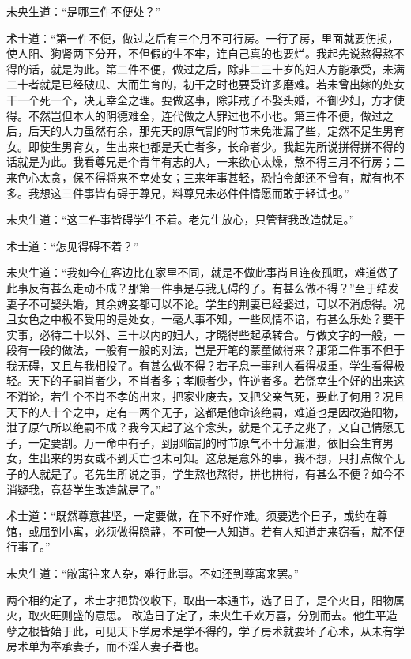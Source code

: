 \documentclass[a4paper,12pt,UTF8,twoside]{ctexbook}
\begin{document}
未央生道：“是哪三件不便处？”

术士道：“第一件不便，做过之后有三个月不可行房。一行了房，里面就要伤损，使人阳、狗肾两下分开，不但假的生不牢，连自己真的也要烂。我起先说熬得熬不得的话，就是为此。第二件不便，做过之后，除非二三十岁的妇人方能承受，未满二十者就是已经破瓜、大而生育的，初干之时也要受许多磨难。若未曾出嫁的处女干一个死一个，决无幸全之理。要做这事，除非戒了不娶头婚，不御少妇，方才使得。不然岂但本人的阴德难全，连代做之人罪过也不小也。第三件不便，做过之后，后天的人力虽然有余，那先天的原气割的时节未免泄漏了些，定然不足生男育女。即使生男育女，生出来也都是夭亡者多，长命者少。我起先所说拼得拼不得的话就是为此。我看尊兄是个青年有志的人，一来欲心太燥，熬不得三月不行房；二来色心太贪，保不得将来不幸处女；三来年事甚轻，恐怕令郎还不曾有，就有也不多。我想这三件事皆有碍于尊兄，料尊兄未必件件情愿而敢于轻试也。”

未央生道：“这三件事皆碍学生不着。老先生放心，只管替我改造就是。”

术士道：“怎见得碍不着？”

未央生道：“我如今在客边比在家里不同，就是不做此事尚且连夜孤眠，难道做了此事反有甚么走动不成？那第一件事是与我无碍的了。有甚么做不得？”至于结发妻子不可娶头婚，其余婢妾都可以不论。学生的荆妻已经娶过，可以不消虑得。况且女色之中极不受用的是处女，一毫人事不知，一些风情不谙，有甚么乐处？要干实事，必待二十以外、三十以内的妇人，才晓得些起承转合。与做文字的一般，一段有一段的做法，一般有一般的对法，岂是开笔的蒙童做得来？那第二件事不但于我无碍，又且与我相投了。有甚么做不得？若子息一事别人看得极重，学生看得极轻。天下的子嗣肖者少，不肖者多；孝顺者少，忤逆者多。若侥幸生个好的出来这不消论，若生个不肖不孝的出来，把家业废去，又把父亲气死，要此子何用？况且天下的人十个之中，定有一两个无子，这都是他命该绝嗣，难道也是因改造阳物，泄了原气所以绝嗣不成？我今天起了这个念头，就是个无子之兆了，又自己情愿无子，一定要割。万一命中有子，到那临割的时节原气不十分漏泄，依旧会生育男女，生出来的男女或不到夭亡也未可知。这总是意外的事，我不想，只打点做个无子的人就是了。老先生所说之事，学生熬也熬得，拼也拼得，有甚么不便？如今不消疑我，竟替学生改造就是了。”

术士道：“既然尊意甚坚，一定要做，在下不好作难。须要选个日子，或约在尊馆，或屈到小寓，必须做得隐静，不可使一人知道。若有人知道走来窃看，就不便行事了。”

未央生道：“敝寓往来人杂，难行此事。不如还到尊寓来罢。”

两个相约定了，术士才把贽仪收下，取出一本通书，选了日子，是个火日，阳物属火，取火旺则盛的意思。 改造日子定了，未央生千欢万喜，分别而去。他生平造孽之根皆始于此，可见天下学房术是学不得的，学了房术就要坏了心术，从未有学房术单为奉承妻子，而不淫人妻子者也。
\end{document}
